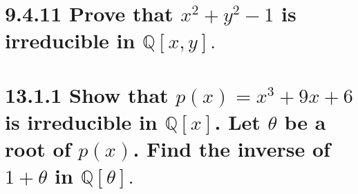 \documentclass{article}
\begin{document}
\section*{\hspace{-1.53cm}9.4.11\Large{} \color{black} \normalfont \hspace{0.1cm}Prove that $x^2
+ y^2 -1$ is irreducible in $\mathbb{Q}[x, y].$}
\newpage
\section*{\hspace{-1.53cm}13.1.1\Large{} \color{black} \normalfont \hspace{0.1cm}Show that $p(x) = x^3 + 9x + 6$ is irreducible in $\mathbb{Q}[x]$. Let \hspace*{0.04cm} $\theta$ be a root of $p(x)$. Find the inverse of $1+\theta$ in $\mathbb{Q}[\theta].$}
\end{document}
